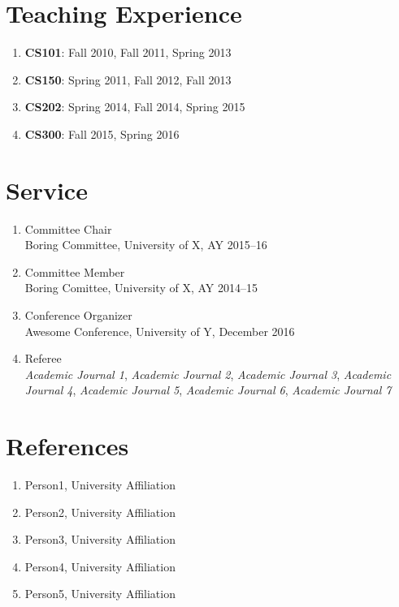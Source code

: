 \documentclass[11pt]{article}
\begin{document}
\section*{Teaching Experience}

\begin{enumerate}[
  itemsep=-.5em,
  leftmargin=\dimexpr\leftmargini+1em\relax,
  labelindent=-1em,
  listparindent=-1em,
  itemindent=-1em
]
\item \textbf{CS101}: Fall 2010, Fall 2011, Spring 2013
\item \textbf{CS150}: Spring 2011, Fall 2012, Fall 2013
\item \textbf{CS202}: Spring 2014, Fall 2014, Spring 2015
\item \textbf{CS300}: Fall 2015, Spring 2016 
\end{enumerate}

\section*{Service}

\begin{enumerate}[
  itemsep=-.5em,
  leftmargin=\dimexpr\leftmargini+1em\relax,
  labelindent=-1em,
  listparindent=-1em,
  itemindent=-1em
]
\item Committee Chair\\
Boring Committee, University of X, AY 2015--16
\item Committee Member\\
Boring Comittee, University of X, AY 2014--15
\item Conference Organizer\\
Awesome Conference, University of Y, December 2016
\item Referee\\
\emph{Academic Journal 1}, \emph{Academic Journal 2}, \emph{Academic Journal 3}, \emph{Academic Journal 4}, \emph{Academic Journal 5}, \emph{Academic Journal 6}, \emph{Academic Journal 7} 
\end{enumerate}


\section*{References}

\begin{enumerate}[
  itemsep=-.5em,
  leftmargin=\dimexpr\leftmargini+1em\relax,
  labelindent=-1em,
  listparindent=-1em,
  itemindent=-1em
]
\item Person1, University Affiliation
\item Person2, University Affiliation
\item Person3, University Affiliation
\item Person4, University Affiliation
\item Person5, University Affiliation
\end{enumerate}
\end{document}
